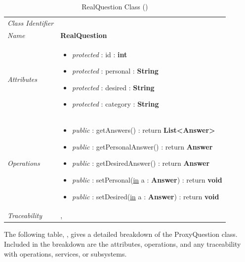 \documentclass[12pt,letterpaper]{article}
\begin{document}
\begin{table}[H]
    \caption{RealQuestion Class ()} 
	\begin{tabu} to 
		\toprule
		Class Identifier &  \\
		Name & {\bf RealQuestion} \\
		Attributes & 
		\begin{minipage}[t]{\linewidth}
		    \begin{itemize}
		        \item \textit{protected} : id : {\bf int}
		        \item \textit{protected} : personal : {\bf String}
		        \item \textit{protected} : desired : {\bf String}
		        \item \textit{protected} : category : {\bf String}
			\end{itemize}
	    \end{minipage} \\

		Operations &
		\begin{minipage}[t]{\linewidth}
			\begin{itemize}
			    \item {\it public} : getAnswers() : return {\bf List<Answer>}
			    \item {\it public} : getPersonalAnswer() : return {\bf Answer}
			    \item {\it public} : getDesiredAnswer() : return {\bf Answer}
			    \item {\it public} : setPersonal(\underline{in} a : {\bf Answer}) : return {\bf void}
			    \item {\it public} : setDesired(\underline{in} a : {\bf Answer}) : return {\bf void}
	        \end{itemize}
	    \end{minipage} \\
	    	Traceability & , \\
		\toprule
	\end{tabu}
\end{table}

The following table, , gives a detailed breakdown of the ProxyQuestion class. Included in the breakdown are the attributes, operations, and any traceability with operations, services, or subsystems.
\end{document}
